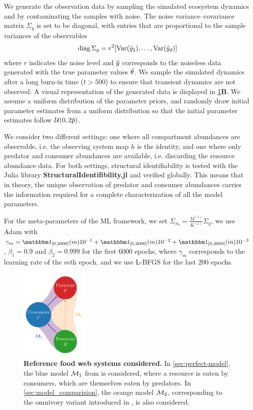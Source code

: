 We generate the observation data by sampling the simulated ecosystem dynamics and by contaminating the samples with noise. The noise variance--covariance matrix $\Sigma_y$ is set to be diagonal, with entries that are proportional to the sample variances of the observables
\begin{equation}
    \operatorname{diag} \Sigma_y = r^2 [{\operatorname{Var}}(\Tilde{y}_1), \dots, {\operatorname{Var}}(\Tilde{y}_d)]
\end{equation}
where $r$ indicates the noise level and $\Tilde{y}$ corresponds to the noiseless data generated with the true parameter values $\Tilde{\theta}$. 
%
We sample the simulated dynamics after a long burn-in time ($t > 500$) to ensure that transient dynamics are not observed.
%
A visual representation of the generated data is displayed in \cref{fig:3species_foodchain_simple}\textbf{B}.
%
We assume a uniform distribution of the parameter priors, and randomly draw initial parameter estimates from a uniform distribution so that the initial parameter estimates follow $\mathcal{U}(0, 2 \Tilde p)$.

We consider two different settings: one where all compartment abundances are observable, i.e. the observing system map $h$ is the identity, and one where only predator and consumer abundances are available, i.e. discarding the resource abundance data.
%
For both settings, structural identifiability is tested with the Julia library \textbf{StructuralIdentifibility.jl} \cite{Dong2021} and verified globally. This means that in theory, the unique observation of predator and consumer abundances carries the information required for a complete characterization of all the model parameters.

For the meta-parameters of the ML framework, we set 
% 
$\Sigma_{x_0} = \frac{M^{(1)}}{K^{(1)}} \Sigma_y$, 
% 
we use Adam with 
% 
$\gamma_m = \one_{[0,2000]}(m) 10^{-1} +\one_{[0,2000]}(m) 10^{-2} + \one_{[0,2000]}(m) 10^{-3} $, $\beta_1 = 0.9$ 
% 
and $\beta_2 = 0.999$ for the first 6000 epochs, where $\gamma_m$ corresponds to the learning rate of the $m$th epoch, and we use L-BFGS for the last 200 epochs.

\begin{figure}[h]
    \centering
    \includegraphics[width=0.3\textwidth]{figures/figure2.pdf}
    \caption{\textbf{Reference food web systems considered.} In \cref{sec:perfect-model}, the blue model $\mathcal{M}_1$ from \cite{Hastings1991} is considered, where a resource is eaten by consumers, which are themselves eaten by predators. In \cref{sec:model_comparision}, the orange model $\mathcal{M}_2$, corresponding to the omnivory variant introduced in \cite{McCann1997}, is also considered.}
    \label{fig:3species_foodchain_simple}
\end{figure}
\FloatBarrier

